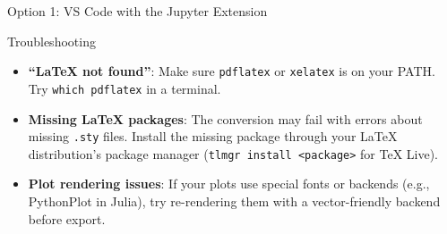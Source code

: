 \documentclass[
  ignorenonframetext,
  aspectratio=169,
]{beamer}
\providecommand{\tightlist}{%
  \setlength{\itemsep}{0pt}\setlength{\parskip}{0pt}}
\begin{document}
\begin{frame}[fragile]{Option 1: VS Code with the Jupyter Extension}
\begin{block}{Troubleshooting}
\protect{}\label{troubleshooting}
\begin{itemize}
\tightlist
\item
  \textbf{``LaTeX not found''}: Make sure \texttt{pdflatex} or
  \texttt{xelatex} is on your PATH. Try \texttt{which\ pdflatex} in a
  terminal.
\item
  \textbf{Missing LaTeX packages}: The conversion may fail with errors
  about missing \texttt{.sty} files. Install the missing package through
  your LaTeX distribution's package manager
  (\texttt{tlmgr\ install\ \textless{}package\textgreater{}} for TeX
  Live).
\item
  \textbf{Plot rendering issues}: If your plots use special fonts or
  backends (e.g., PythonPlot in Julia), try re-rendering them with a
  vector-friendly backend before export.
\end{itemize}
\end{block}
\end{frame}
\end{document}
